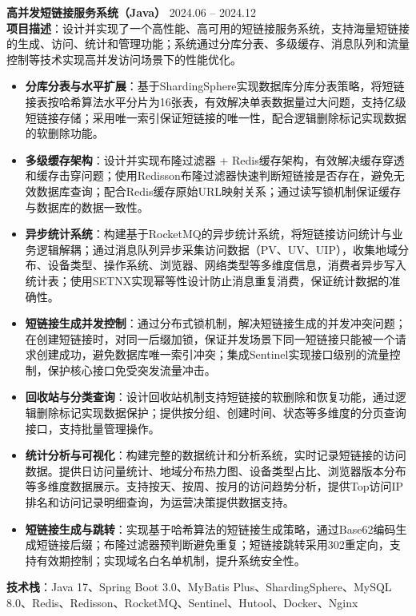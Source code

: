 \noindent
\textbf{高并发短链接服务系统（Java）} \hfill 2024.06 – 2024.12 \\
\textbf{项目描述}：设计并实现了一个高性能、高可用的短链接服务系统，支持海量短链接的生成、访问、统计和管理功能；系统通过分库分表、多级缓存、消息队列和流量控制等技术实现高并发访问场景下的性能优化。
\begin{itemize}
    \item \textbf{分库分表与水平扩展}：基于ShardingSphere实现数据库分库分表策略，将短链接表按哈希算法水平分片为16张表，有效解决单表数据量过大问题，支持亿级短链接存储；采用唯一索引保证短链接的唯一性，配合逻辑删除标记实现数据的软删除功能。
    \item \textbf{多级缓存架构}：设计并实现布隆过滤器 + Redis缓存架构，有效解决缓存穿透和缓存击穿问题；使用Redisson布隆过滤器快速判断短链接是否存在，避免无效数据库查询；配合Redis缓存原始URL映射关系；通过读写锁机制保证缓存与数据库的数据一致性。
    \item \textbf{异步统计系统}：构建基于RocketMQ的异步统计系统，将短链接访问统计与业务逻辑解耦；通过消息队列异步采集访问数据（PV、UV、UIP），收集地域分布、设备类型、操作系统、浏览器、网络类型等多维度信息，消费者异步写入统计表；使用SETNX实现幂等性设计防止消息重复消费，保证统计数据的准确性。
    \item \textbf{短链接生成并发控制}：通过分布式锁机制，解决短链接生成的并发冲突问题；在创建短链接时，对同一后缀加锁，保证并发场景下同一短链接只能被一个请求创建成功，避免数据库唯一索引冲突；集成Sentinel实现接口级别的流量控制，保护核心接口免受突发流量冲击。
    \item \textbf{回收站与分类查询}：设计回收站机制支持短链接的软删除和恢复功能，通过逻辑删除标记实现数据保护；提供按分组、创建时间、状态等多维度的分页查询接口，支持批量管理操作。
    \item \textbf{统计分析与可视化}：构建完整的数据统计和分析系统，实时记录短链接的访问数据。提供日访问量统计、地域分布热力图、设备类型占比、浏览器版本分布等多维度数据展示。支持按天、按周、按月的访问趋势分析，提供Top访问IP排名和访问记录明细查询，为运营决策提供数据支持。
    \item \textbf{短链接生成与跳转}：实现基于哈希算法的短链接生成策略，通过Base62编码生成短链接后缀；布隆过滤器预判断避免重复；短链接跳转采用302重定向，支持有效期控制；实现域名白名单机制，提升系统安全性。
\end{itemize}
\textbf{技术栈}：Java 17、Spring Boot 3.0、MyBatis Plus、ShardingSphere、MySQL 8.0、Redis、Redisson、RocketMQ、Sentinel、Hutool、Docker、Nginx
\vspace{0.2cm}
